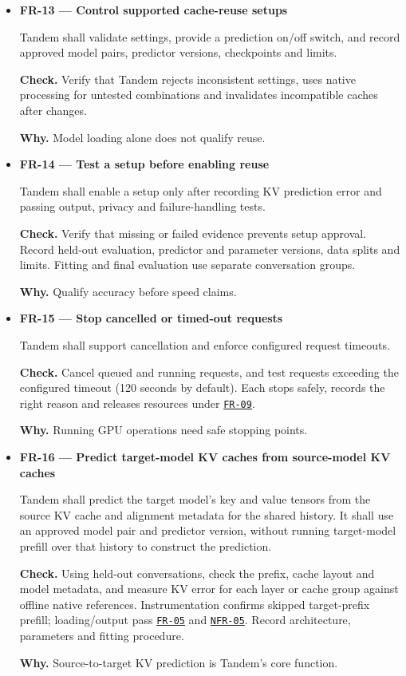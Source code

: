 \documentclass[12pt]{article}
\begin{document}
\begin{itemize}
\item {}\label{req:FR-13}
\textbf{FR-13 --- Control supported cache-reuse setups}\par
Tandem shall validate settings, provide a prediction on/off switch, and record approved model pairs, predictor versions, checkpoints and limits.\par
\textbf{Check.} Verify that Tandem rejects inconsistent settings, uses native processing for untested combinations and invalidates incompatible caches after changes.\par
\textbf{Why.} Model loading alone does not qualify reuse.


\item {}\label{req:FR-14}
\textbf{FR-14 --- Test a setup before enabling reuse}\par
Tandem shall enable a setup only after recording KV prediction error and passing output, privacy and failure-handling tests.\par
\textbf{Check.} Verify that missing or failed evidence prevents setup approval. Record held-out evaluation, predictor and parameter versions, data splits and limits. Fitting and final evaluation use separate conversation groups.\par
\textbf{Why.} Qualify accuracy before speed claims.


\item {}\label{req:FR-15}
\textbf{FR-15 --- Stop cancelled or timed-out requests}\par
Tandem shall support cancellation and enforce configured request timeouts.\par
\textbf{Check.} Cancel queued and running requests, and test requests exceeding the configured timeout (120 seconds by default). Each stops safely, records the right reason and releases resources under \hyperref[req:FR-09]{\texttt{FR-09}}.\par
\textbf{Why.} Running GPU operations need safe stopping points.


\item {}\label{req:FR-16}
\textbf{FR-16 --- Predict target-model KV caches from source-model KV caches}\par
Tandem shall predict the target model's key and value tensors from the source KV cache and alignment metadata for the shared history. It shall use an approved model pair and predictor version, without running target-model prefill over that history to construct the prediction.\par
\textbf{Check.} Using held-out conversations, check the prefix, cache layout and model metadata, and measure KV error for each layer or cache group against offline native references. Instrumentation confirms skipped target-prefix prefill; loading/output pass \hyperref[req:FR-05]{\texttt{FR-05}} and \hyperref[req:NFR-05]{\texttt{NFR-05}}. Record architecture, parameters and fitting procedure.\par
\textbf{Why.} Source-to-target KV prediction is Tandem's core function.
\end{itemize}
\end{document}
